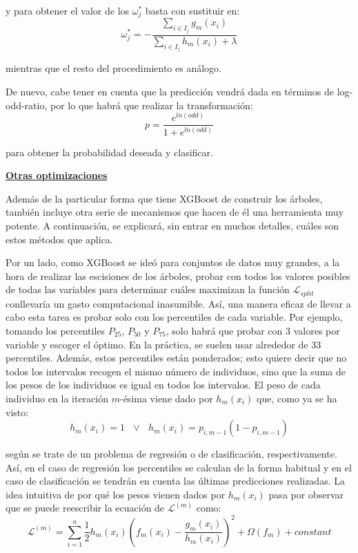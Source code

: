 \documentclass[12pt,twoside]{article}
\begin{document}
\noindent
y para obtener el valor de los $\omega_j^*$ basta con sustituir en:
\begin{equation*}
\omega_j^* = - \frac{\sum_{i \in I_j} g_m(x_i)}{\sum_{i \in I_j} h_m(x_i) + \lambda}
\end{equation*}

\noindent
mientras que el resto del procedimiento es análogo.

De nuevo, cabe tener en cuenta que la predicción vendrá dada en términos de log-odd-ratio, por lo que habrá que realizar la transformación:
\begin{equation*}
p = \frac{e^{ln(odd)}}{1 + e^{ln(odd)}}
\end{equation*}

\noindent
para obtener la probabilidad deseada y clasificar.

\bigskip \bigskip

\textbf{\underline{Otras optimizaciones}}

Además de la particular forma que tiene XGBoost de construir los árboles, también incluye otra serie de mecanismos que hacen de él una herramienta muy potente. A continuación, se explicará, sin entrar en muchos detalles, cuáles son estos métodos que aplica.

Por un lado, como XGBoost se ideó para conjuntos de datos muy grandes, a la hora de realizar las escisiones de los árboles, probar con todos los valores posibles de todas las variables para determinar cuáles maximizan la función $\mathcal{L}_{split}$ conllevaría un gasto computacional inasumible. Así, una manera eficaz de llevar a cabo esta tarea es probar solo con los percentiles de cada variable. Por ejemplo, tomando los percentiles $P_{25}$, $P_{50}$ y $P_{75}$, solo habrá que probar con 3 valores por variable y escoger el óptimo. En la práctica, se suelen usar alrededor de 33 percentiles. Además, estos percentiles están ponderados; esto quiere decir que no todos los intervalos recogen el mismo número de individuos, sino que la suma de los pesos de los individuos es igual en todos los intervalos. El peso de cada individuo en la iteración $m$-ésima viene dado por $h_m(x_i)$ que, como ya se ha visto:
\begin{equation*}
h_m(x_i) = 1 \, \, \, \, \vee \, \, \, \, h_m(x_i) = p_{i, m-1}(1 - p_{i, m-1})
\end{equation*}

\noindent
según se trate de un problema de regresión o de clasificación, respectivamente. Así, en el caso de regresión los percentiles se calculan de la forma habitual y en el caso de clasificación se tendrán en cuenta las últimas predicciones realizadas. La idea intuitiva de por qué los pesos vienen dados por $h_m(x_i)$ pasa por observar que se puede reescribir la ecuación de $\mathcal{L}^{(m)}$ como:
\begin{equation*}
\mathcal{L}^{(m)} = \sum_{i = 1}^n \frac{1}{2} h_m(x_i) \left( f_m(x_i) - \frac{g_m(x_i)}{h_m(x_i)} \right)^2 + \Omega(f_m) + constant
\end{equation*}
\end{document}
